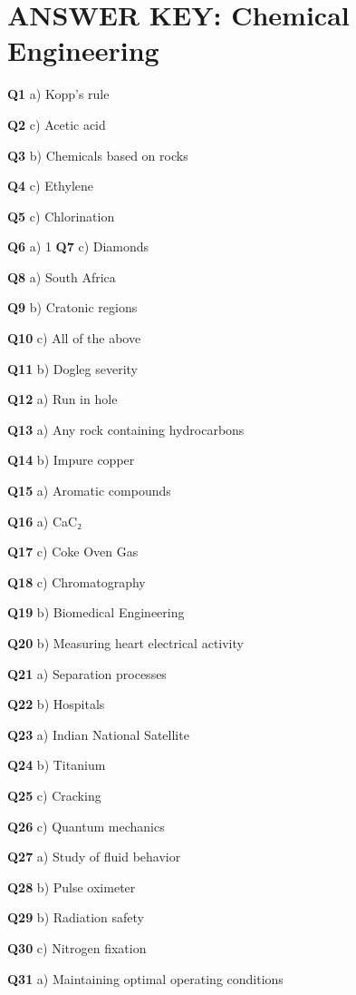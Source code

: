 \section{ANSWER KEY: Chemical Engineering}

\textbf{Q1} a) Kopp's rule\par
\textbf{Q2} c) Acetic acid\par
\textbf{Q3} b) Chemicals based on rocks\par
\textbf{Q4} c) Ethylene\par
\textbf{Q5} c) Chlorination\par
\textbf{Q6} a) 1%
\textbf{Q7} c) Diamonds\par
\textbf{Q8} a) South Africa\par
\textbf{Q9} b) Cratonic regions\par
\textbf{Q10} c) All of the above\par
\textbf{Q11} b) Dogleg severity\par
\textbf{Q12} a) Run in hole\par
\textbf{Q13} a) Any rock containing hydrocarbons\par
\textbf{Q14} b) Impure copper\par
\textbf{Q15} a) Aromatic compounds\par
\textbf{Q16} a) CaC₂\par
\textbf{Q17} c) Coke Oven Gas\par
\textbf{Q18} c) Chromatography\par
\textbf{Q19} b) Biomedical Engineering\par
\textbf{Q20} b) Measuring heart electrical activity\par
\textbf{Q21} a) Separation processes\par
\textbf{Q22} b) Hospitals\par
\textbf{Q23} a) Indian National Satellite\par
\textbf{Q24} b) Titanium\par
\textbf{Q25} c) Cracking\par
\textbf{Q26} c) Quantum mechanics\par
\textbf{Q27} a) Study of fluid behavior\par
\textbf{Q28} b) Pulse oximeter\par
\textbf{Q29} b) Radiation safety\par
\textbf{Q30} c) Nitrogen fixation\par
\textbf{Q31} a) Maintaining optimal operating conditions\par
